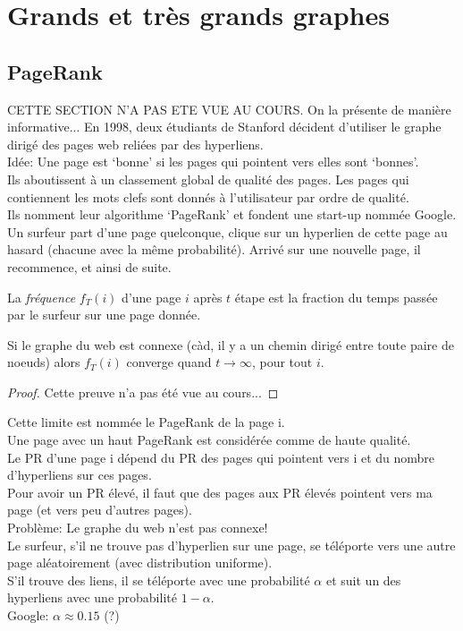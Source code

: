 \section{Grands et très grands graphes}
\subsection{PageRank}
CETTE SECTION N'A PAS ETE VUE AU COURS. On la présente de manière informative...
En 1998, deux étudiants de Stanford décident d’utiliser le graphe dirigé des pages web reliées par des hyperliens.\\
Idée: Une page est ‘bonne’ si les pages qui pointent vers elles sont ‘bonnes’.\\
Ils aboutissent à un classement global de qualité des pages. Les pages qui contiennent les mots clefs sont donnés à l’utilisateur par ordre de qualité.\\
Ils nomment leur algorithme ‘PageRank’ et fondent une start-up nommée Google. \\
Un surfeur part d’une page quelconque, clique sur un hyperlien de cette page au hasard (chacune avec la même probabilité). Arrivé sur une nouvelle page, il recommence, et ainsi de suite.\\
\begin{mydef}
  La \emph{fréquence} $f_T(i)$ d’une page $i$ après $t$ étape est la fraction du temps passée par le surfeur sur une page donnée.
\end{mydef}

\begin{mytheo}
  Si le graphe du web est connexe (càd, il y a un chemin dirigé entre toute paire de noeuds) alors $f_T(i)$ converge quand $t \to ∞$, pour tout $i$.
  \begin{proof}
     Cette preuve n'a pas été vue au cours...
  \end{proof}
\end{mytheo}

Cette limite est nommée le PageRank de la page i.\\
Une page avec un haut PageRank est considérée comme de haute qualité.\\
Le PR d’une page i dépend du PR des pages qui pointent vers i et du nombre d’hyperliens sur ces pages.\\
Pour avoir un PR élevé, il faut que des pages aux PR élevés pointent vers ma page (et vers peu d’autres pages).\\
\newline
Problème: Le graphe du web n’est pas connexe!\\
Le surfeur, s’il ne trouve pas d’hyperlien sur une page, se téléporte vers une autre page aléatoirement (avec distribution uniforme).\\
S’il trouve des liens, il se téléporte avec une probabilité $\alpha$ et suit un des hyperliens avec une probabilité $1 − \alpha$.\\
Google: $\alpha ≈ 0.15$ (?)
